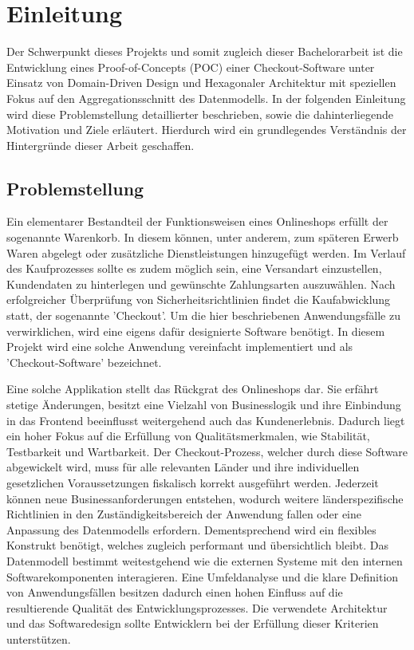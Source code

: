 

\chapter{Einleitung}

Der Schwerpunkt dieses Projekts und somit zugleich dieser Bachelorarbeit ist die Entwicklung eines Proof-of-Concepts (\acrshort{POC}) einer Checkout-Software unter Einsatz von Domain-Driven Design und Hexagonaler Architektur mit speziellen Fokus auf den Aggregationsschnitt des Datenmodells. In der folgenden Einleitung wird diese Problemstellung detaillierter beschrieben, sowie die dahinterliegende Motivation und Ziele erläutert. Hierdurch wird ein grundlegendes Verständnis der Hintergründe dieser Arbeit geschaffen.

\section{Problemstellung}

Ein elementarer Bestandteil der Funktionsweisen eines Onlineshops erfüllt der sogenannte Warenkorb. In diesem können, unter anderem, zum späteren Erwerb Waren abgelegt oder zusätzliche Dienstleistungen hinzugefügt werden. Im Verlauf des Kaufprozesses sollte es zudem möglich sein, eine Versandart einzustellen, Kundendaten zu hinterlegen und gewünschte Zahlungsarten auszuwählen. Nach erfolgreicher Überprüfung von Sicherheitsrichtlinien findet die Kaufabwicklung statt, der sogenannte 'Checkout'. Um die hier beschriebenen Anwendungsfälle zu verwirklichen, wird eine eigens dafür designierte Software benötigt. In diesem Projekt wird eine solche Anwendung vereinfacht implementiert und als 'Checkout-Software' bezeichnet.

Eine solche Applikation stellt das Rückgrat des Onlineshops dar. Sie erfährt stetige Änderungen, besitzt eine Vielzahl von Businesslogik und ihre Einbindung in das Frontend beeinflusst weitergehend auch das Kundenerlebnis. Dadurch liegt ein hoher Fokus auf die Erfüllung von Qualitätsmerkmalen, wie Stabilität, Testbarkeit und Wartbarkeit. Der Checkout-Prozess, welcher durch diese Software abgewickelt wird, muss für alle relevanten Länder und ihre individuellen gesetzlichen Voraussetzungen fiskalisch korrekt ausgeführt werden. Jederzeit können neue Businessanforderungen entstehen, wodurch weitere länderspezifische Richtlinien in den Zuständigkeitsbereich der Anwendung fallen oder eine Anpassung des Datenmodells erfordern. Dementsprechend wird ein flexibles Konstrukt benötigt, welches zugleich performant und übersichtlich bleibt. Das Datenmodell bestimmt weitestgehend wie die externen Systeme mit den internen Softwarekomponenten interagieren. Eine Umfeldanalyse und die klare Definition von Anwendungsfällen besitzen dadurch einen hohen Einfluss auf die resultierende Qualität des Entwicklungsprozesses. Die verwendete Architektur und das Softwaredesign sollte Entwicklern bei der Erfüllung dieser Kriterien unterstützen. 

